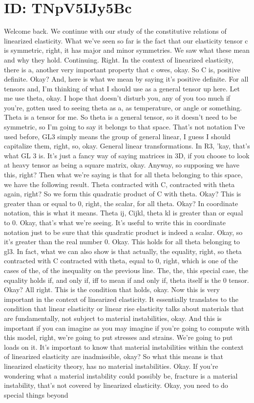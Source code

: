 \documentclass[10pt]{article}
\begin{document}
\section*{ID: TNpV5IJy5Bc}
Welcome back. We continue with our study of the constitutive relations of linearized elasticity. What we've seen so far is the fact that our elasticity tensor c is symmetric, right, it has major and minor symmetries. We saw what these mean and why they hold. Continuing. Right. In the context of linearized elasticity, there is a, another very important property that c owes, okay. So C is, positive definite. Okay? And, here is what we mean by saying it's positive definite. For all tensors and, I'm thinking of what I should use as a general tensor up here. Let me use theta, okay. I hope that doesn't disturb you, any of you too much if you're, gotten used to seeing theta as a, as temperature, or angle or something. Theta is a tensor for me. So theta is a general tensor, so it doesn't need to be symmetric, so I'm going to say it belongs to that space. That's not notation I've used before, GL3 simply means the group of general linear, I guess I should capitalize them, right, so, okay. General linear transformations. In R3, 'kay, that's what GL 3 is. It's just a fancy way of saying matrices in 3D, if you choose to look at heavy tensor as being a square matrix, okay. Anyway, so supposing we have this, right? Then what we're saying is that for all theta belonging to this space, we have the following result. Theta contracted with C, contracted with theta again, right? So we form this quadratic product of C with theta. Okay? This is greater than or equal to 0, right, the scalar, for all theta. Okay? In coordinate notation, this is what it means. Theta ij, Cijkl, theta kl is greater than or equal to 0. Okay, that's what we're seeing. It's useful to write this in coordinate notation just to be sure that this quadratic product is indeed a scalar. Okay, so it's greater than the real number 0. Okay. This holds for all theta belonging to gl3. In fact, what we can also show is that actually, the equality, right, so theta contracted with C contracted with theta, equal to 0, right, which is one of the cases of the, of the inequality on the previous line. The, the, this special case, the equality holds if, and only if, iff to mean if and only if, theta itself is the 0 tensor. Okay? All right. This is the condition that holds, okay. Now this is very important in the context of linearized elasticity. It essentially translates to the condition that linear elasticity or linear rise elasticity talks about materials that are fundamentally, not subject to material instabilities, okay. And this is important if you can imagine as you may imagine if you're going to compute with this model, right, we're going to put stresses and strains. We're going to put loads on it. It's important to know that material instabilities within the context of linearized elasticity are inadmissible, okay? So what this means is that linearized  elasticity theory,  has no material instabilities. Okay. If you're wondering what a material instability could possibly be, fracture is a material instability, that's not covered by linearized elasticity. Okay, you need to do special things beyond 
\end{document}
